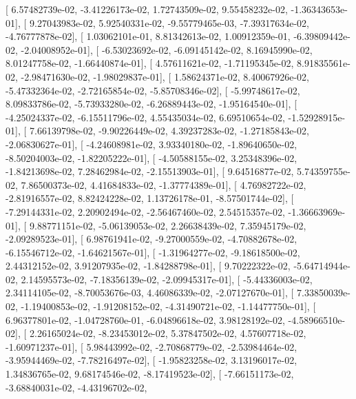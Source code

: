\documentclass{article}
\begin{document}
       [  6.57482739e-02,  -3.41226173e-02,   1.72743509e-02,
          9.55458232e-02,  -1.36343653e-01],
       [  9.27043983e-02,   5.92540331e-02,  -9.55779465e-03,
         -7.39317634e-02,  -4.76777878e-02],
       [  1.03062101e-01,   8.81342613e-02,   1.00912359e-01,
         -6.39809442e-02,  -2.04008952e-01],
       [ -6.53023692e-02,  -6.09145142e-02,   8.16945990e-02,
          8.01247758e-02,  -1.66440874e-01],
       [  4.57611621e-02,  -1.71195345e-02,   8.91835561e-02,
         -2.98471630e-02,  -1.98029837e-01],
       [  1.58624371e-02,   8.40067926e-02,  -5.47332364e-02,
         -2.72165854e-02,  -5.85708346e-02],
       [ -5.99748617e-02,   8.09833786e-02,  -5.73933280e-02,
         -6.26889443e-02,  -1.95164540e-01],
       [ -4.25024337e-02,  -6.15511796e-02,   4.55435034e-02,
          6.69510654e-02,  -1.52928915e-01],
       [  7.66139798e-02,  -9.90226449e-02,   4.39237283e-02,
         -1.27185843e-02,  -2.06830627e-01],
       [ -4.24608981e-02,   3.93340180e-02,  -1.89640650e-02,
         -8.50204003e-02,  -1.82205222e-01],
       [ -4.50588155e-02,   3.25348396e-02,  -1.84213698e-02,
          7.28462984e-02,  -2.15513903e-01],
       [  9.64516877e-02,   5.74359755e-02,   7.86500373e-02,
          4.41684833e-02,  -1.37774389e-01],
       [  4.76982722e-02,  -2.81916557e-02,   8.82424228e-02,
          1.13726178e-01,  -8.57501744e-02],
       [ -7.29144331e-02,   2.20902494e-02,  -2.56467460e-02,
          2.54515357e-02,  -1.36663969e-01],
       [  9.88771151e-02,  -5.06139053e-02,   2.26638439e-02,
          7.35945179e-02,  -2.09289523e-01],
       [  6.98761941e-02,  -9.27000559e-02,  -4.70882678e-02,
         -6.15546712e-02,  -1.64621567e-01],
       [ -1.31964277e-02,  -9.18618500e-02,   2.44312152e-02,
          3.91207935e-02,  -1.84288798e-01],
       [  9.70222322e-02,  -5.64714944e-02,   2.14595573e-02,
         -7.18356139e-02,  -2.09945317e-01],
       [ -5.44336003e-02,   2.34114105e-02,  -8.70053676e-03,
          4.46086339e-02,  -2.07127670e-01],
       [  7.33850039e-02,  -1.19400853e-02,  -1.91208152e-02,
         -4.31490721e-02,  -1.14477750e-01],
       [  6.96377801e-02,  -1.04728760e-01,  -6.04896618e-02,
          3.98128192e-02,  -4.58966510e-02],
       [  2.26165024e-02,  -8.23453012e-02,   5.37847502e-02,
          4.57607718e-02,  -1.60971237e-01],
       [  5.98443992e-02,  -2.70868779e-02,  -2.53984464e-02,
         -3.95944469e-02,  -7.78216497e-02],
       [ -1.95823258e-02,   3.13196017e-02,   1.34836765e-02,
          9.68174546e-02,  -8.17419523e-02],
       [ -7.66151173e-02,  -3.68840031e-02,  -4.43196702e-02,
\end{document}
